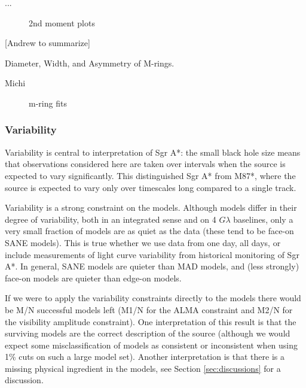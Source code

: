 ...


\begin{figure}
  \caption{2nd moment plots}
  \label{fig:cmp_2nd_moment}
\end{figure}

[Andrew to summarize]


Diameter, Width, and Asymmetry of M-rings.

Michi

\begin{figure}
  \caption{m-ring fits}
  \label{fig:cmp_m-ring}
\end{figure}

\subsubsection{Variability}

Variability is central to interpretation of Sgr A*: the small black hole size means that observations considered here are taken over intervals when the source is expected to vary significantly.  This distinguished Sgr A* from M87*, where the source is expected to vary only over timescales long compared to a single track.

Variability is a strong constraint on the models.  Although models differ in their degree of variability, both in an integrated sense and on 4 $G\lambda$ baselines, only a very small fraction of models are as quiet as the data (these tend to be face-on SANE models).  This is true whether we use data from one day, all days, or include measurements of light curve variability from historical monitoring of Sgr A*.   In general, SANE models are quieter than MAD models, and (less strongly) face-on models are quieter than edge-on models.

If we were to apply the variability constraints directly to the models there would be M/N successful models left (M1/N for the ALMA constraint and M2/N for the visibility amplitude constraint).  One interpretation of this result is that the surviving models are the correct description of the source (although we would expect some misclassification of models as consistent or inconsistent when using 1\% cuts on such a large model set).  Another interpretation is that there is a missing physical ingredient in the models, see Section \ref{sec:discussions} for a discussion.

